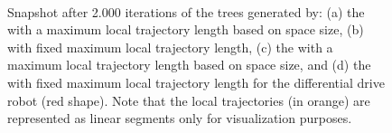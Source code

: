 \begin{figure} [h!]
    \centering
    \\
    \caption{Snapshot after 2.000 iterations of the trees generated by: (a) the  with a maximum local trajectory length based on space size, (b)  with fixed maximum local trajectory length, (c) the  with a maximum local trajectory length based on space size, and (d) the  with fixed maximum local trajectory length for the differential drive robot (red shape).
    Note that the local trajectories (in orange) are represented as linear segments only for visualization purposes.}%
    \label{fig:unic_tree}%
\end{figure}

